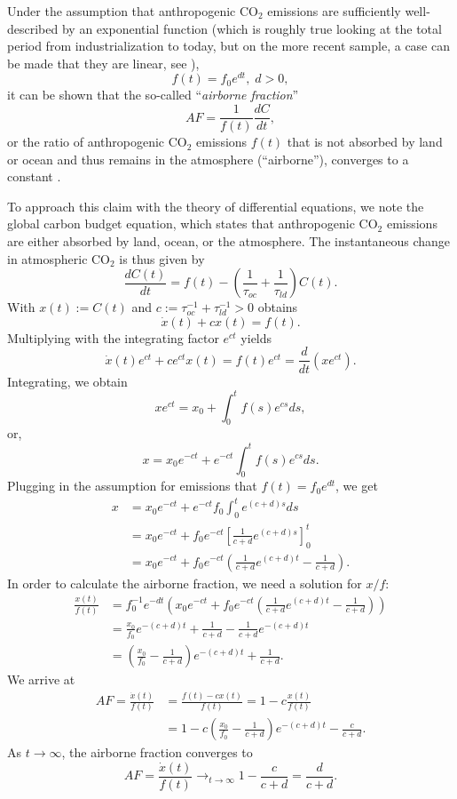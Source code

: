 \documentclass[graybox]{svmult}
\begin{document}
Under the assumption that anthropogenic CO$_2$ emissions are sufficiently well-described by an exponential function (which is roughly true looking at the total period from industrialization to today, but on the more recent sample, a case can be made that they are linear, see \cite{Bennedsen2023}),
\[
f(t) = f_0 e^{dt}, \; d>0,
\]
it can be shown that the so-called ``\textit{airborne fraction}'' 
\[
AF = \frac{1}{f(t)}\frac{dC}{dt},
\]
or the ratio of anthropogenic CO$_2$ emissions $f(t)$ that is not absorbed by land or ocean and thus remains in the atmosphere (``airborne''), converges to a constant \citep{Bennedsen2019}.

To approach this claim with the theory of differential equations, we note the global carbon budget equation, which states that anthropogenic CO$_2$ emissions are either absorbed by land, ocean, or the atmosphere. The instantaneous change in atmospheric CO$_2$ is thus given by 
\[
\frac{d C(t)}{dt} = f(t) - \left(\frac{1}{\tau_{oc}} + \frac{1}{\tau_{ld}}\right) C(t).
\]
With $x(t):= C(t)$ and $c:=\tau_{oc}^{-1}+\tau_{ld}^{-1}>0$ obtains
\[
\dot x(t) + c x(t) = f(t).
\]
Multiplying with the integrating factor $e^{ct}$ yields
\[
\dot x(t) e^{ct} + c e^{ct} x(t) = f(t) e^{ct} = \frac{d}{dt} (xe^{ct}).
\]
Integrating, we obtain
\[
xe^{ct} = x_0 + \int_0^t f(s) e^{cs} ds,
\]
or,
\[
x = x_0 e^{-ct} + e^{-ct}\int_0^t f(s) e^{cs} ds.
\]
Plugging in the assumption for emissions that $f(t) = f_0 e^{dt}$, we get
\begin{align*}
x &= x_0 e^{-ct} + e^{-ct}f_0\int_0^t e^{(c+d)s} ds \\
 &= x_0 e^{-ct} + f_0 e^{-ct} \left[ \frac{1}{c+d} e^{(c+d)s} \right]_0^t \\
 &= x_0 e^{-ct} + f_0 e^{-ct} \left( \frac{1}{c+d} e^{(c+d)t} -  \frac{1}{c+d}\right).
\end{align*}
In order to calculate the airborne fraction, we need a solution for $x/f$:
\begin{align*}
\frac{x(t)}{f(t)} &= f_0^{-1} e^{-dt} \left(x_0 e^{-ct} + f_0 e^{-ct} \left( \frac{1}{c+d} e^{(c+d)t} -  \frac{1}{c+d}\right)\right) \\
 &= \frac{x_0}{f_0} e^{-(c+d)t} + \frac{1}{c+d} - \frac{1}{c+d} e^{-(c+d)t} \\
 &= \left(\frac{x_0}{f_0} - \frac{1}{c+d}\right)e^{-(c+d)t} + \frac{1}{c+d}.
\end{align*}
We arrive at
\begin{align*}
AF=\frac{\dot x(t)}{f(t)} &= \frac{f(t) - c x(t)}{f(t)} = 1 - c \frac{x(t)}{f(t)}\\
 &= 1 - c \left(\frac{x_0}{f_0} - \frac{1}{c+d}\right)e^{-(c+d)t} -  \frac{c}{c+d}.
\end{align*}
As $t\to\infty$, the airborne fraction converges to
\[
AF=\frac{\dot x(t)}{f(t)} \to_{t\to\infty} 1-\frac{c}{c+d} = \frac{d}{c+d}.
\]
\end{document}
